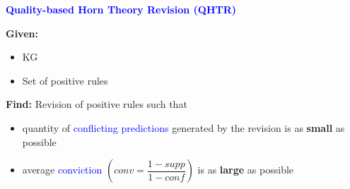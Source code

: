 \documentclass{beamer}
\newcommand{\bl}[1]{\textcolor{blue}{#1}}
\newcommand{\mi}[1]{\ensuremath{\mathit{#1}}}
\begin{document}
\begin{frame}
{{\begin{beamerboxesrounded}[upper=uppercolblue,lower=lowercolblue,shadow=true]{\textbf{\bl{Quality-based Horn Theory Revision (QHTR)}}}
\smallskip

\textbf{Given:} 
\begin{itemize}
\item KG
\item Set of positive rules
\end{itemize}

\bigskip
\noindent \textbf{Find:} Revision of positive rules such that

\normalsize{\begin{itemize}

\item quantity of \bl{conflicting predictions} generated by the revision is as \textbf{small} as possible\smallskip

\item average \bl{conviction} $(\mi{conv=\dfrac{1-supp}{1-conf}})$ is as \textbf{large} as possible~\footnotesize{\cite{rulemeasures}}

\end{itemize}}

\end{beamerboxesrounded}}
}

\end{frame}
\end{document}

